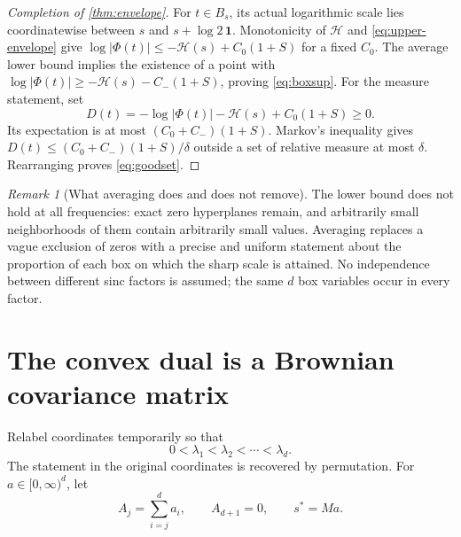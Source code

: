 \documentclass[11pt,a4paper]{article}
\numberwithin{equation}{section}
\theoremstyle{definition}
\theoremstyle{remark}\newtheorem{remark}[theorem]{Remark}
\newcommand{\one}{\mathbf 1}
\newcommand{\He}{\mathcal H}
\begin{document}
\begin{proof}[Completion of \cref{thm:envelope}]
For $t\in B_s$, its actual logarithmic scale lies coordinatewise between
$s$ and $s+\log2\,\one$. Monotonicity of $\He$ and
\eqref{eq:upper-envelope} give
$\log|\Phi(t)|\le-\He(s)+C_0(1+S)$ for a fixed $C_0$.
The average lower bound implies the existence of a point with
$\log|\Phi(t)|\ge-\He(s)-C_-(1+S)$, proving \eqref{eq:boxsup}.
For the measure statement, set
\[
 D(t)=-\log|\Phi(t)|-\He(s)+C_0(1+S)\ge0.
\]
Its expectation is at most $(C_0+C_-)(1+S)$. Markov's inequality gives
$D(t)\le(C_0+C_-)(1+S)/\delta$ outside a set of relative measure at most
$\delta$. Rearranging proves \eqref{eq:goodset}.
\end{proof}

\begin{remark}[What averaging does and does not remove]
The lower bound does not hold at all frequencies: exact zero hyperplanes
remain, and arbitrarily small neighborhoods of them contain arbitrarily
small values. Averaging replaces a vague exclusion of zeros with a precise
and uniform statement about the proportion of each box on which the sharp
scale is attained. No independence between different sinc factors is assumed;
the same $d$ box variables occur in every factor.
\end{remark}

\section{The convex dual is a Brownian covariance matrix}
\label{sec:dual}

Relabel coordinates temporarily so that
\begin{equation}
 0<\lambda_1<\lambda_2<\cdots<\lambda_d.
 \label{eq:sort}
\end{equation}
The statement in the original coordinates is recovered by permutation.
For $a\in[0,\infty)^d$, let
\begin{equation}
 A_j=\sum_{i=j}^da_i,\qquad A_{d+1}=0,
 \qquad s^*=Ma.
 \label{eq:tails}
\end{equation}
\end{document}
